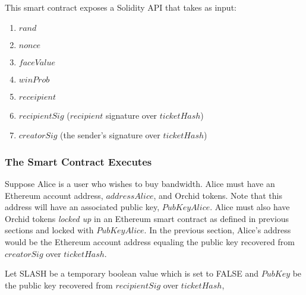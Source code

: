 This smart contract exposes a Solidity API that takes as input:
\begin{enumerate}%
  \item $rand$
  \item $nonce$
  \item $faceValue$
  \item $winProb$
  \item $receipient$
  \item $recipientSig$ ($recipient$ signature over $ticketHash$)
  \item $creatorSig$ (the sender's signature over $ticketHash$)
\end{enumerate}

\subsubsection{The Smart Contract Executes}


Suppose Alice is a user who wishes to buy bandwidth. Alice must have an Ethereum account address, $addressAlice$, and Orchid tokens. Note that this address will have an associated public key, $PubKeyAlice$. Alice must also have Orchid tokens \textit{locked up} in an Ethereum smart contract as defined in previous sections and locked with $PubKeyAlice$. In the previous section, Alice's address would be the Ethereum account address equaling the public key recovered from $creatorSig$ over $ticketHash$.

Let SLASH be a temporary boolean value which is set to FALSE and $PubKey$ be the public key recovered from $recipientSig$ over $ticketHash$,

